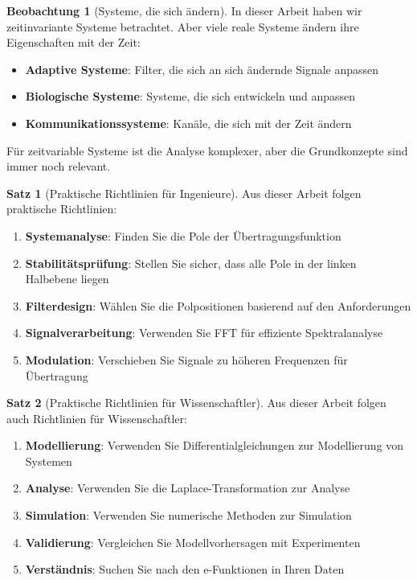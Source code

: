 ﻿\documentclass[a4paper,12pt]{report}
\theoremstyle{definition}
\newtheorem{satz}{Satz}
\newtheorem{beobachtung}{Beobachtung}
\begin{document}
	\begin{beobachtung}[Systeme, die sich ändern]
		In dieser Arbeit haben wir zeitinvariante Systeme betrachtet. Aber viele reale Systeme ändern ihre Eigenschaften mit der Zeit:
		\begin{itemize}
			\item[-] \textbf{Adaptive Systeme}: Filter, die sich an sich ändernde Signale anpassen
			\item[-] \textbf{Biologische Systeme}: Systeme, die sich entwickeln und anpassen
			\item[-] \textbf{Kommunikationssysteme}: Kanäle, die sich mit der Zeit ändern
		\end{itemize}
		
		Für zeitvariable Systeme ist die Analyse komplexer, aber die Grundkonzepte sind immer noch relevant.
	\end{beobachtung}
	
	\begin{satz}[Praktische Richtlinien für Ingenieure]
		Aus dieser Arbeit folgen praktische Richtlinien:
		
		\begin{enumerate}
			\item[-] \textbf{Systemanalyse}: Finden Sie die Pole der Übertragungsfunktion
			\item[-] \textbf{Stabilitätsprüfung}: Stellen Sie sicher, dass alle Pole in der linken Halbebene liegen
			\item[-] \textbf{Filterdesign}: Wählen Sie die Polpositionen basierend auf den Anforderungen
			\item[-] \textbf{Signalverarbeitung}: Verwenden Sie FFT für effiziente Spektralanalyse
			\item[-] \textbf{Modulation}: Verschieben Sie Signale zu höheren Frequenzen für Übertragung
		\end{enumerate}
	\end{satz}
	
	\begin{satz}[Praktische Richtlinien für Wissenschaftler]
		Aus dieser Arbeit folgen auch Richtlinien für Wissenschaftler:
		
		\begin{enumerate}
			\item[-] \textbf{Modellierung}: Verwenden Sie Differentialgleichungen zur Modellierung von Systemen
			\item[-] \textbf{Analyse}: Verwenden Sie die Laplace-Transformation zur Analyse
			\item[-] \textbf{Simulation}: Verwenden Sie numerische Methoden zur Simulation
			\item[-] \textbf{Validierung}: Vergleichen Sie Modellvorhersagen mit Experimenten
			\item[-] \textbf{Verständnis}: Suchen Sie nach den e-Funktionen in Ihren Daten
		\end{enumerate}
	\end{satz}
	
\end{document}
